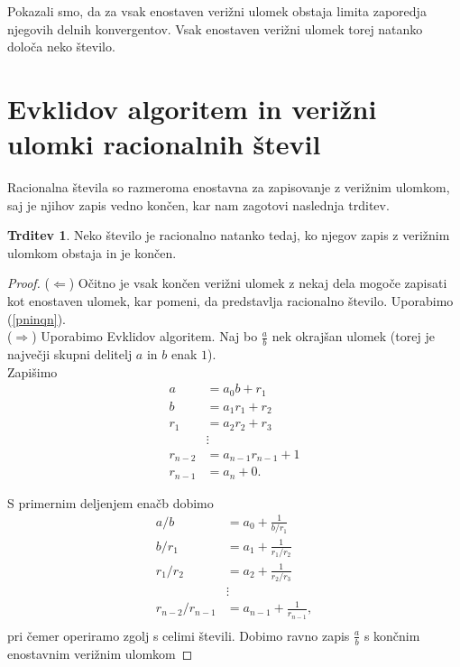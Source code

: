 \documentclass[a4paper,12pt]{article}
\theoremstyle{definition}
\theoremstyle{proposition}
\newtheorem{trd}{Trditev}[section]
\theoremstyle{theorem}
\theoremstyle{lemma}
\begin{document}
Pokazali smo, da za vsak enostaven verižni ulomek obstaja limita zaporedja njegovih delnih konvergentov. Vsak enostaven verižni ulomek torej natanko določa neko število.

\section{Evklidov algoritem in verižni ulomki racionalnih števil} \label{racionalna}

Racionalna števila so razmeroma enostavna za zapisovanje z verižnim ulomkom, saj je njihov zapis vedno končen, kar nam zagotovi naslednja trditev.

\begin{trd}
\label{lastnosracionalnega}
Neko število je racionalno natanko tedaj, ko njegov zapis z verižnim ulomkom obstaja in je končen.
\end{trd}

\begin{proof}
($\Leftarrow$) Očitno je vsak končen verižni ulomek z nekaj dela mogoče zapisati kot enostaven ulomek, kar pomeni, da predstavlja racionalno število. Uporabimo (\ref{pninqn}).\\
($\Rightarrow$) Uporabimo Evklidov algoritem. Naj bo $\frac{a}{b}$ nek okrajšan ulomek (torej je največji skupni delitelj $a$ in $b$ enak $1$).\\
Zapišimo
\begin{align*}
a &= a_0 b + r_1 \\
b &= a_1 r_1 + r_2 \\
r_1 &= a_2 r_2 + r_3 \\
&\vdots \\
r_{n-2} &= a_{n-1} r_{n-1} + 1 \\
r_{n-1} &= a_n + 0.
\end{align*}

\vspace{5mm}

S primernim deljenjem enačb dobimo
\begin{align*}
a/b &= a_0 + \frac{1}{b/r_1} \\
b/r_1 &= a_1 + \frac{1}{r_1/r_2} \\
r_1/r_2 &= a_2 + \frac{1}{r_2/r_3} \\
&\vdots \\
r_{n-2}/r_{n-1} &= a_{n-1} + \frac{1}{r_{n-1}}, \\
\end{align*}
pri čemer operiramo zgolj s celimi števili. Dobimo ravno zapis $\frac{a}{b}$ s končnim enostavnim verižnim ulomkom
\end{proof}
\end{document}
